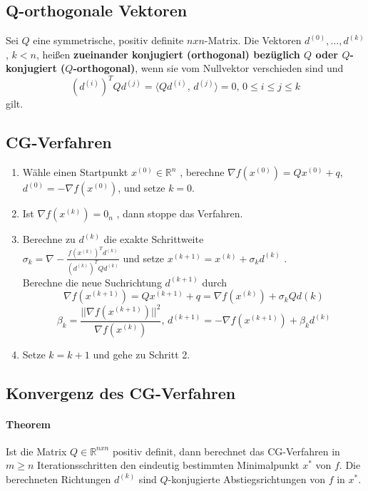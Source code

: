 \subsection{Q-orthogonale Vektoren}
\begin{Definition}
	Sei $Q$ eine symmetrische, positiv definite $n x n$-Matrix. Die Vektoren $d^{(0)} , \dots , d^{(k)}$ , $k < n$, heißen \textbf{zueinander konjugiert (orthogonal) bezüglich $Q$ oder $Q$-konjugiert ($Q$-orthogonal)}, wenn sie vom
	Nullvektor verschieden sind und $$(d^{(i)})^TQd^{(j)} = \langle Qd^{(i)} \text{, }d^{(j)}\rangle = 0 \text{, } 0 \leq i \le j \leq k$$ gilt.

\end{Definition}

\subsection{CG-Verfahren}
\begin{enumerate}
	\item Wähle einen Startpunkt $x^{(0)} \in \mathbb{R}^n$ , berechne $\nabla f(x^{(0)}) = Qx^{(0)} + q$, $d^{(0)} = -\nabla f(x^{(0)})$, und setze $k = 0$.
	\item Ist $\nabla f(x^{(k)}) = 0_n$ , dann stoppe das Verfahren.
	\item Berechne zu $d^{(k)}$ die exakte Schrittweite \\
	$	\sigma_k =\nabla -\frac{f(x^{(k)})^T d^{(k)}}{(d^{(k)})^TQd^{(k)}}$ und setze
	$x^{(k+1)} = x^{(k)} + \sigma_k d^{(k)}$ .\\
	Berechne die neue Suchrichtung $d^{(k+1)}$ durch
$$\nabla f(x^{(k+1)}) = Qx^{(k+1)}+q = \nabla f(x^{(k)})+\sigma_kQd{(k)}$$
$$\beta_k = \frac{||\nabla f(x^{(k+1)})||^2}{\nabla f(x^{(k)})}\text{, } d^{(k+1)} = -\nabla f(x^{(k+1)}) + \beta_kd^{(k)}$$
	\item Setze $k = k + 1$ und gehe zu Schritt 2.
\end{enumerate}


\subsection{Konvergenz des CG-Verfahren}
\paragraph{Theorem}
Ist die Matrix $Q \in \mathbb{R}^{n x n}$ positiv definit, dann berechnet das CG-Verfahren in $m \geq n$ Iterationsschritten den eindeutig bestimmten Minimalpunkt $x^{*}$ von $f$. Die berechneten Richtungen $d^{(k)}$ sind $Q$-konjugierte Abstiegsrichtungen von $f$ in $x^{*}$.

